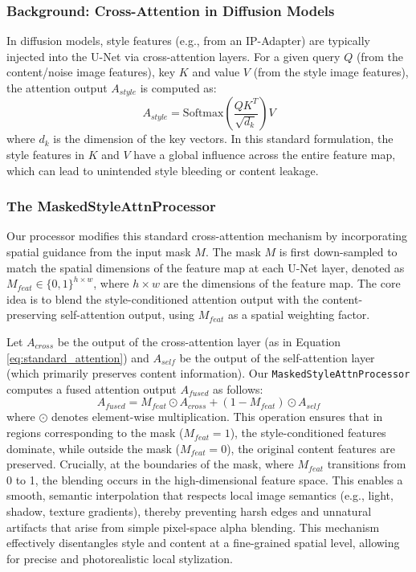 \subsubsection{Background: Cross-Attention in Diffusion Models}
In diffusion models, style features (e.g., from an IP-Adapter) are typically injected into the U-Net via cross-attention layers. For a given query $Q$ (from the content/noise image features), key $K$ and value $V$ (from the style image features), the attention output $A_{style}$ is computed as:
\begin{equation}
    A_{style} = \text{Softmax}\left(\frac{QK^T}{\sqrt{d_k}}\right)V
    \label{eq:standard_attention}
\end{equation}
where $d_k$ is the dimension of the key vectors. In this standard formulation, the style features in $K$ and $V$ have a global influence across the entire feature map, which can lead to unintended style bleeding or content leakage.

\subsubsection{The MaskedStyleAttnProcessor}
Our processor modifies this standard cross-attention mechanism by incorporating spatial guidance from the input mask $M$. The mask $M$ is first down-sampled to match the spatial dimensions of the feature map at each U-Net layer, denoted as $M_{feat} \in \{0, 1\}^{h \times w}$, where $h \times w$ are the dimensions of the feature map. The core idea is to blend the style-conditioned attention output with the content-preserving self-attention output, using $M_{feat}$ as a spatial weighting factor.

Let $A_{cross}$ be the output of the cross-attention layer (as in Equation \ref{eq:standard_attention}) and $A_{self}$ be the output of the self-attention layer (which primarily preserves content information). Our \texttt{MaskedStyleAttnProcessor} computes a fused attention output $A_{fused}$ as follows:
\begin{equation}
    A_{fused} = M_{feat} \odot A_{cross} + (1 - M_{feat}) \odot A_{self}
    \label{eq:fused_attention}
\end{equation}
where $\odot$ denotes element-wise multiplication. This operation ensures that in regions corresponding to the mask ($M_{feat}=1$), the style-conditioned features dominate, while outside the mask ($M_{feat}=0$), the original content features are preserved. Crucially, at the boundaries of the mask, where $M_{feat}$ transitions from 0 to 1, the blending occurs in the high-dimensional feature space. This enables a smooth, semantic interpolation that respects local image semantics (e.g., light, shadow, texture gradients), thereby preventing harsh edges and unnatural artifacts that arise from simple pixel-space alpha blending. This mechanism effectively disentangles style and content at a fine-grained spatial level, allowing for precise and photorealistic local stylization.